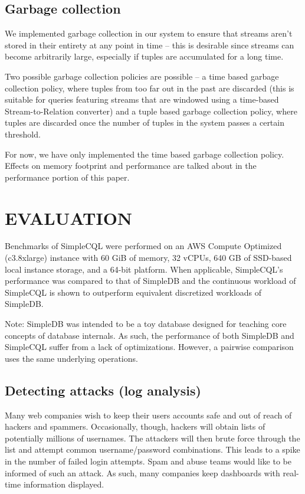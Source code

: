 \documentclass[a4paper, 10pt, conference]{IEEEconf}
\begin{document}
\subsection{Garbage collection}
We implemented garbage collection in our system to ensure that streams aren’t stored in their entirety at any point in time -- this is desirable since streams can become arbitrarily large, especially if tuples are accumulated for a long time.

Two possible garbage collection policies are possible -- a time based garbage collection policy, where tuples from too far out in the past are discarded (this is suitable for queries featuring streams that are windowed using a time-based Stream-to-Relation converter) and a tuple based garbage collection policy, where tuples are discarded once the number of tuples in the system passes a certain threshold.

For now, we have only implemented the time based garbage collection policy. Effects on memory footprint and performance are talked about in the performance portion of this paper.


\section{EVALUATION}
Benchmarks of SimpleCQL were performed on an AWS Compute Optimized (c3.8xlarge) instance with 60 GiB of memory, 32 vCPUs, 640 GB of SSD-based local instance storage, and a 64-bit platform.  When applicable, SimpleCQL’s performance was compared to that of SimpleDB and the continuous workload of SimpleCQL is shown to outperform equivalent discretized workloads of SimpleDB.  

Note: SimpleDB was intended to be a toy database designed for teaching core concepts of database internals.  As such, the performance of both SimpleDB and SimpleCQL suffer from a lack of optimizations.  However, a pairwise comparison uses the same underlying operations.

\subsection{Detecting attacks (log analysis)}
Many web companies wish to keep their users accounts safe and out of reach of hackers and spammers.  Occasionally, though, hackers will obtain lists of potentially millions of usernames.  The attackers will then brute force through the list and attempt common username/password combinations.  This leads to a spike in the number of failed login attempts.  Spam and abuse teams would like to be informed of such an attack.  As such, many companies keep dashboards with real-time information displayed.
\end{document}
